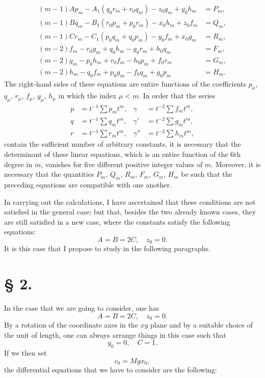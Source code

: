 \documentclass{article}
\begin{document}
\begin{align*}
(m - 1)Ap_m - A_1(q_0r_m + r_0q_m) - z_0g_m + y_0h_m &= P_m, \\
(m - 1)Bq_m - B_1(r_0p_m + p_0r_m) - x_0h_m + z_0f_m &= Q_m, \\
(m - 1)Cr_m - C_1(p_0q_m + q_0p_m) - y_0f_m + x_0g_m &= R_m, \\
(m - 2)f_m - r_0g_m + q_0h_m - g_0r_m + h_0q_m &= F_m, \\
(m - 2)g_m - p_0h_m + r_0f_m - h_0p_m + f_0r_m &= G_m, \\
(m - 2)h_m - q_0f_m + p_0g_m - f_0q_m + g_0p_m &= H_m.
\end{align*}
The right-hand sides of these equations are entire functions of the coefficients $p_\mu$, $q_\mu$, $r_\mu$, $f_\mu$, $g_\mu$, $h_\mu$ in which the index $\mu < m$.
In order that the series
\begin{align*}
p &= t^{-1}\sum p_m t^m, & \gamma &= t^{-2}\sum f_m t^m, \\
q &= t^{-1}\sum q_m t^m, & \gamma' &= t^{-2}\sum g_m t^m, \\
r &= t^{-1}\sum r_m t^m, & \gamma'' &= t^{-2}\sum h_m t^m,
\end{align*}
contain the sufficient number of arbitrary constants, it is necessary that the determinant of these linear equations, which is an entire function of the 6th degree in $m$, vanishes for five different positive integer values of $m$. Moreover, it is necessary that the quantities $P_m$, $Q_m$, $R_m$, $F_m$, $G_m$, $H_m$ be such that the preceding equations are compatible with one another.

In carrying out the calculations, I have ascertained that these conditions are not satisfied in the general case; but that, besides the two already known cases, they are still satisfied in a new case, where the constants satisfy the following equations:
\[
A = B = 2C, \quad z_0 = 0.
\]
It is this case that I propose to study in the following paragraphs.

\section*{§ 2.}
\setcounter{equation}{0}

In the case that we are going to consider, one has
\[
A = B = 2C, \quad z_0 = 0.
\]
By a rotation of the coordinate axes in the $xy$ plane and by a suitable choice of the unit of length, one can always arrange things in this case such that
\[
y_0 = 0, \quad C = 1.
\]
If we then set
\[
c_0 = Mgx_0,
\]
the differential equations that we have to consider are the following:
\end{document}
